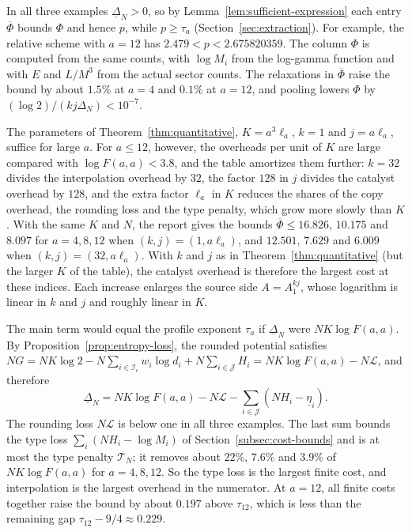 In all three examples \(\underline\Delta_N>0\), so by
Lemma~\ref{lem:sufficient-expression} each entry \(\overline\Phi\) bounds
\(\Phi\) and hence \(p\), while \(p\ge\tau_a\)
(Section~\ref{sec:extraction}). For
example, the relative scheme with \(a=12\) has
\(2.479<p<2.675820359\). The column \(\Phi\) is computed from the same
counts, with \(\log M_i\) from the log-gamma function and with \(E\) and
\(L/M^3\) from the actual sector counts. The relaxations in
\(\overline\Phi\) raise the bound by about \(1.5\%\) at \(a=4\) and
\(0.1\%\) at \(a=12\), and pooling lowers \(\Phi\) by
\((\log2)/(kj\Delta_N)<10^{-7}\).

The parameters of Theorem~\ref{thm:quantitative}, \(K=a^3\ell_a\),
\(k=1\) and \(j=a\ell_a\), suffice for large \(a\). For \(a\le12\),
however, the overheads per unit of \(K\) are large compared with
\(\log F(a,a)<3.8\), and the table amortizes them further: \(k=32\)
divides the interpolation overhead by \(32\), the factor \(128\) in \(j\)
divides the catalyst overhead by \(128\), and the extra factor \(\ell_a\)
in \(K\) reduces the shares of the copy overhead, the rounding loss and
the type penalty, which grow more slowly than \(K\). With the same \(K\)
and \(N\), the report gives the bounds \(\overline\Phi\le16.826\),
\(10.175\) and \(8.097\) for \(a=4,8,12\) when \((k,j)=(1,a\ell_a)\), and
\(12.501\), \(7.629\) and \(6.009\) when \((k,j)=(32,a\ell_a)\). With
\(k\) and \(j\) as in Theorem~\ref{thm:quantitative} (but the larger \(K\)
of the table), the catalyst overhead is therefore the largest cost at
these indices. Each increase enlarges the source side
\(A=A_1^{kj}\), whose logarithm is linear in \(k\) and \(j\) and roughly
linear in \(K\).

The main term would equal the profile exponent \(\tau_a\) if
\(\underline\Delta_N\) were \(NK\log F(a,a)\). By
Proposition~\ref{prop:entropy-loss}, the rounded potential satisfies
\(NG=NK\log2-N\sum_{i\in\mathcal I_c}w_i\log d_i+N\sum_{i\in\mathcal J}H_i
=NK\log F(a,a)-N\mathcal L\), and therefore
\[
 \underline\Delta_N=NK\log F(a,a)-N\mathcal L
 -\sum_{i\in\mathcal J}(NH_i-\underline\eta_i).
\]
The rounding loss \(N\mathcal L\) is below one in all three examples. The
last sum bounds the type loss \(\sum_i(NH_i-\log M_i)\) of
Section~\ref{subsec:cost-bounds} and is at most the type penalty
\(\mathcal T_N\); it removes about \(22\%\), \(7.6\%\) and \(3.9\%\) of
\(NK\log F(a,a)\) for \(a=4,8,12\). So the type loss is the largest
finite cost, and interpolation is the largest overhead in the numerator.
At \(a=12\), all finite costs together raise the bound by about
\(0.197\) above \(\tau_{12}\), which is less than the remaining gap
\(\tau_{12}-9/4\approx0.229\).

